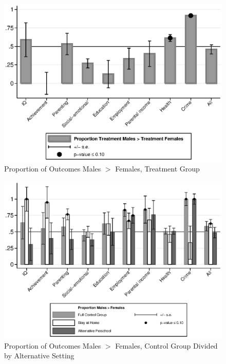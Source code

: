 \begin{figure}
\centering
\caption{Proportion of Outcomes Males $>$ Females, Treatment Group}
\includegraphics[width=\textwidth]{output/gendergaps-treatment}
\end{figure}

\begin{figure}
\centering
\caption{Proportion of Outcomes Males $>$ Females, Control Group Divided by Alternative Setting}
\includegraphics[width=\textwidth]{output/gendergaps-control-moderated-altpre}
\end{figure}

